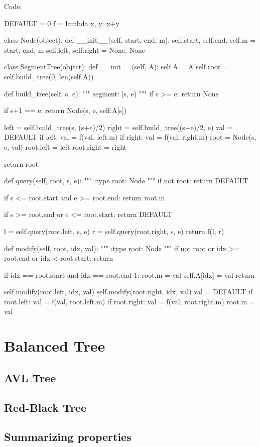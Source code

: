 Code:
\begin{python}
DEFAULT = 0
f = lambda x, y: x+y


class Node(object):
    def __init__(self, start, end, m):
        self.start, self.end, self.m = start, end, m
        self.left, self.right = None, None


class SegmentTree(object):
    def __init__(self, A):
        self.A = A
        self.root = self.build_tree(0, len(self.A))

    def build_tree(self, s, e):
        """
        segment: [s, e)
        """
        if s >= e:
            return None

        if s+1 == e:
            return Node(s, e, self.A[s])

        left = self.build_tree(s, (s+e)/2)
        right = self.build_tree((s+e)/2, e)
        val = DEFAULT
        if left: val = f(val, left.m)
        if right: val = f(val, right.m)
        root = Node(s, e, val)
        root.left = left
        root.right = right

        return root

    def query(self, root, s, e):
        """
        :type root: Node
        """
        if not root:
            return DEFAULT

        if s <= root.start and e >= root.end:
            return root.m

        if s >= root.end or e <= root.start:
            return DEFAULT

        l = self.query(root.left, s, e)
        r = self.query(root.right, s, e)
        return f(l, r)

    def modify(self, root, idx, val):
        """
        :type root: Node
        """
        if not root or idx >= root.end or idx < root.start:
            return

        if idx == root.start and idx == root.end-1:
            root.m = val
            self.A[idx] = val
            return

        self.modify(root.left, idx, val)
        self.modify(root.right, idx, val)
        val = DEFAULT
        if root.left: val = f(val, root.left.m)
        if root.right: val = f(val, root.right.m)
        root.m = val
\end{python}
\section{Balanced Tree}

\subsection{AVL Tree}

\subsection{Red-Black Tree}

\subsection{Summarizing properties}



